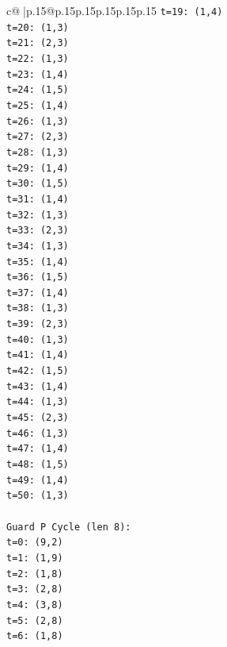 \documentclass{article}
\begin{document}
{\begin{supertabular}{c@{$\;$}|p{.15\linewidth}@{}p{.15\linewidth}p{.15\linewidth}p{.15\linewidth}p{.15\linewidth}p{.15\linewidth}}
{{{\texttt{t=19: (1,4)} \\
\texttt{t=20: (1,3)} \\
\texttt{t=21: (2,3)} \\
\texttt{t=22: (1,3)} \\
\texttt{t=23: (1,4)} \\
\texttt{t=24: (1,5)} \\
\texttt{t=25: (1,4)} \\
\texttt{t=26: (1,3)} \\
\texttt{t=27: (2,3)} \\
\texttt{t=28: (1,3)} \\
\texttt{t=29: (1,4)} \\
\texttt{t=30: (1,5)} \\
\texttt{t=31: (1,4)} \\
\texttt{t=32: (1,3)} \\
\texttt{t=33: (2,3)} \\
\texttt{t=34: (1,3)} \\
\texttt{t=35: (1,4)} \\
\texttt{t=36: (1,5)} \\
\texttt{t=37: (1,4)} \\
\texttt{t=38: (1,3)} \\
\texttt{t=39: (2,3)} \\
\texttt{t=40: (1,3)} \\
\texttt{t=41: (1,4)} \\
\texttt{t=42: (1,5)} \\
\texttt{t=43: (1,4)} \\
\texttt{t=44: (1,3)} \\
\texttt{t=45: (2,3)} \\
\texttt{t=46: (1,3)} \\
\texttt{t=47: (1,4)} \\
\texttt{t=48: (1,5)} \\
\texttt{t=49: (1,4)} \\
\texttt{t=50: (1,3)} \\
\\ 
\texttt{Guard P Cycle (len 8):} \\
\texttt{t=0: (9,2)} \\
\texttt{t=1: (1,9)} \\
\texttt{t=2: (1,8)} \\
\texttt{t=3: (2,8)} \\
\texttt{t=4: (3,8)} \\
\texttt{t=5: (2,8)} \\
\texttt{t=6: (1,8)} \\
}}}
\end{supertabular}}
\end{document}
